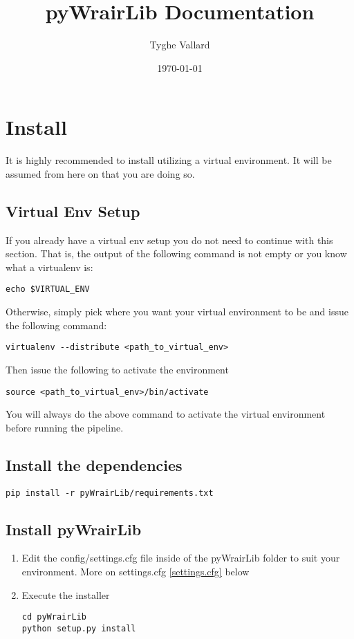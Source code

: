 \documentclass{article}
\begin{document}
\title{pyWrairLib Documentation}
\author{Tyghe Vallard}
\date{\today}
\maketitle
\tableofcontents

\section{Install}
It is highly recommended to install utilizing a virtual environment. It will be assumed from here on that you are doing so.

\subsection{Virtual Env Setup}
If you already have a virtual env setup you do not need to continue with this section.
That is, the output of the following command is not empty or you know what a virtualenv is:
\begin{lstlisting}
echo $VIRTUAL_ENV
\end{lstlisting}
Otherwise, simply pick where you want your virtual environment to be and issue the following command:

\begin{lstlisting}
virtualenv --distribute <path_to_virtual_env>
\end{lstlisting}

Then issue the following to activate the environment

\begin{lstlisting}
source <path_to_virtual_env>/bin/activate
\end{lstlisting}

You will always do the above command to activate the virtual environment before running the pipeline.

\subsection{Install the dependencies}
\begin{lstlisting}
pip install -r pyWrairLib/requirements.txt
\end{lstlisting}

\subsection{Install pyWrairLib}
\begin{enumerate}
 \item Edit the config/settings.cfg file inside of the pyWrairLib folder to suit your environment. More on settings.cfg \ref{settings.cfg} below
 \item Execute the installer
\begin{lstlisting}
cd pyWrairLib
python setup.py install
\end{lstlisting}
\end{enumerate}
\end{document}
